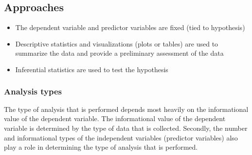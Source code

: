 \documentclass[
  letterpaper,
]{scrbook}
\providecommand{\tightlist}{%
  \setlength{\itemsep}{0pt}\setlength{\parskip}{0pt}}\usepackage{longtable,booktabs,array}
\begin{document}
\hypertarget{ida-approaches}{%
\subsection{Approaches}\label{ida-approaches}}

\begin{itemize}
\tightlist
\item
  The dependent variable and predictor variables are fixed (tied to
  hypothesis)
\item
  Descriptive statistics and visualizations (plots or tables) are used
  to summarize the data and provide a preliminary assessment of the data
\item
  Inferential statistics are used to test the hypothesis
\end{itemize}

\hypertarget{ida-analysis-types}{%
\subsubsection{Analysis types}\label{ida-analysis-types}}

The type of analysis that is performed depends most heavily on the
informational value of the dependent variable. The informational value
of the dependent variable is determined by the type of data that is
collected. Secondly, the number and informational types of the
independent variables (predictor variables) also play a role in
determining the type of analysis that is performed.
\end{document}

